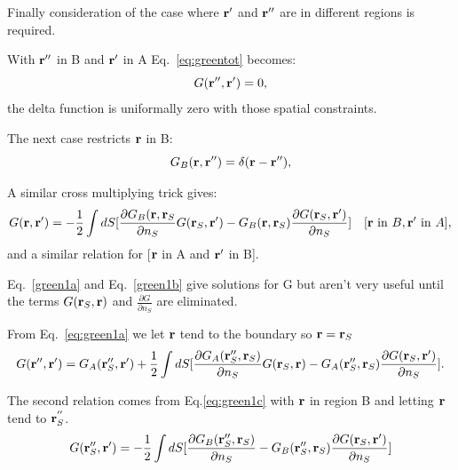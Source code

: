 Finally consideration of the case where ${\bf r}'$ and ${\bf r}''$ are in different regions is required.

With ${\bf r}''$ in B and ${\bf r}'$ in A Eq.~\ref{eq:greentot} becomes:
%
\begin{equation}
[-\frac{1}{2}\nabla^{2}_{\r''} + V(\r'') - E]G(\r'',\r') = 0,
\end{equation}
%
the delta function is uniformally zero with those spatial constraints.

The next case restricts ${\bf r}$ in B:
%
\begin{equation}
[-\frac{1}{2}\nabla^{2}_{\r''} + V(\r'') - E]G_B(\r,\r'')= \delta(\r-\r''),
\end{equation}
%

A similar cross multiplying trick gives:
%
\begin{equation}
\label{eq:green1c}
G({\bf r},{\bf r}') = -\frac{1}{2} \int dS[\frac{\partial G_{B}({\bf r}, {\bf r}_{S}}{\partial n_{S}} G({\bf r}_{S},{\bf r}')
- G_{B}({\bf r}, {\bf r}_{S})\frac{\partial G({\bf r}_{S},{\bf r}')}{\partial n_{S}}] \quad [{\bf r}~{\rm in}~B, {\bf r}'~{\rm in}~A],
\end{equation}
%
and a similar relation for [${\bf r}$ in A and ${\bf r}'$ in B].

Eq.~\ref{green1a} and Eq.~\ref{green1b} give solutions for G but 
aren't very useful until the terms $G({\bf r}_S,{\bf r})$ and 
$\frac{\partial G}{\partial n_{S}}$ are eliminated.

From Eq.~\ref{eq:green1a} we let ${\bf r}$ tend to the boundary so ${\bf r} = {\bf r}_{S}$
%
\begin{equation}
\label{eq:greensys1}
G({\bf r}'',{\bf r}') = G_{A}({\bf r}''_{S}, {\bf r}') + \frac{1}{2} \int d{S}
[\frac{\partial G_{A}({\bf r}''_{S}, {\bf r}_{S})}{\partial n_{S}} G({\bf r}_{S},{\bf r}) - 
G_{A}({\bf r}''_{S},{\bf r}_{S})\frac{\partial{G({\bf r}_{S}, {\bf r}')}}{\partial n_{S}}].
\end{equation}
%

The second relation comes from Eq.\ref{eq:green1c} with 
${\bf r}$ in region B and letting ${\bf r}$ tend to ${\bf r}^{''}_{S}$.
%
\begin{equation}
\label{eq:greensys2}
G({\bf r}''_{S}, {\bf r}') = -\frac{1}{2}\int dS [\frac{\partial G_{B}({\bf r}''_{S}, {\bf r}_{S})}{\partial n_{S}}
-G_{B}({\bf r}''_{S},{\bf r}_{S})\frac{\partial G({\bf r}_{S},{\bf r}')}{\partial n_{S}}]
\end{equation}
%

